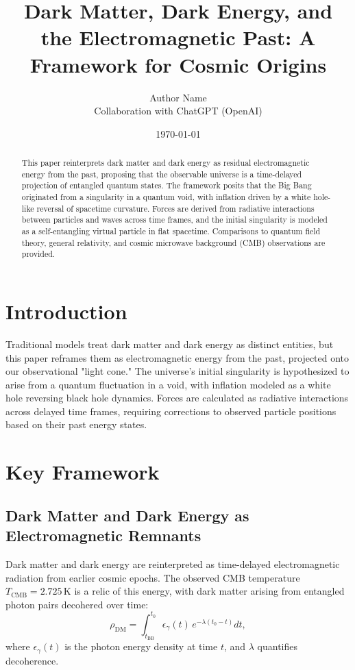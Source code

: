 \documentclass{article}
\title{Dark Matter, Dark Energy, and the Electromagnetic Past: A Framework for Cosmic Origins}
\author{Author Name \\ Collaboration with ChatGPT (OpenAI)}
\date{\today}
\begin{document}
\maketitle

\begin{abstract}
This paper reinterprets dark matter and dark energy as residual electromagnetic energy from the past, proposing that the observable universe is a time-delayed projection of entangled quantum states. The framework posits that the Big Bang originated from a singularity in a quantum void, with inflation driven by a white hole-like reversal of spacetime curvature. Forces are derived from radiative interactions between particles and waves across time frames, and the initial singularity is modeled as a self-entangling virtual particle in flat spacetime. Comparisons to quantum field theory, general relativity, and cosmic microwave background (CMB) observations are provided.
\end{abstract}

\section{Introduction}
Traditional models treat dark matter and dark energy as distinct entities, but this paper reframes them as electromagnetic energy from the past, projected onto our observational "light cone." The universe's initial singularity is hypothesized to arise from a quantum fluctuation in a void, with inflation modeled as a white hole reversing black hole dynamics. Forces are calculated as radiative interactions across delayed time frames, requiring corrections to observed particle positions based on their past energy states.

\section{Key Framework}
\subsection{Dark Matter and Dark Energy as Electromagnetic Remnants}
Dark matter and dark energy are reinterpreted as time-delayed electromagnetic radiation from earlier cosmic epochs. The observed CMB temperature \( T_{\text{CMB}} = 2.725 \, \text{K} \) is a relic of this energy, with dark matter arising from entangled photon pairs decohered over time:
\[
\rho_{\text{DM}} = \int_{t_{\text{BB}}}^{t_0} \epsilon_{\gamma}(t) \, e^{-\lambda (t_0 - t)} dt,
\]
where \( \epsilon_{\gamma}(t) \) is the photon energy density at time \( t \), and \( \lambda \) quantifies decoherence.
\end{document}
